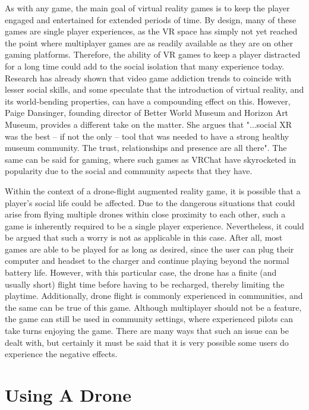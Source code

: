 \documentclass[10pt,twocolumn]{article}
\begin{document}
As with any game, the main goal of virtual reality games is to keep the player engaged and entertained for extended periods of time. By design, many of these games are single player experiences, as the VR space has simply not yet reached the point where multiplayer games are as readily available as they are on other gaming platforms. Therefore, the ability of VR games to keep a player distracted for a long time could add to the social isolation that many experience today. Research has already shown that video game addiction trends to coincide with lesser social skills\cite{SocialSkillsVG}, and some speculate that the introduction of virtual reality, and its world-bending properties, can have a compounding effect on this. However, Paige Dansinger, founding director of Better World Museum and Horizon Art Museum, provides a different take on the matter. She argues that "...social XR was the best – if not the only – tool that was needed to have a strong healthy museum community. The trust, relationships and presence are all there"\cite{MuseumVR}. The same can be said for gaming, where such games as VRChat have skyrocketed in popularity due to the social and community aspects that they have. 

Within the context of a drone-flight augmented reality game, it is possible that a player's social life could be affected. Due to the dangerous situations that could arise from flying multiple drones within close proximity to each other, such a game is inherently required to be a single player experience. Nevertheless, it could be argued that such a worry is not as applicable in this case. After all, most games are able to be played for as long as desired, since the user can plug their computer and headset to the charger and continue playing beyond the normal battery life. However, with this particular case, the drone has a finite (and usually short) flight time before having to be recharged, thereby limiting the playtime. Additionally, drone flight is commonly experienced in communities, and the same can be true of this game. Although multiplayer should not be a feature, the game can still be used in community settings, where experienced pilots can take turns enjoying the game. There are many ways that such an issue can be dealt with, but certainly it must be said that it is very possible some users do experience the negative effects.

\section{Using A Drone}
\end{document}
